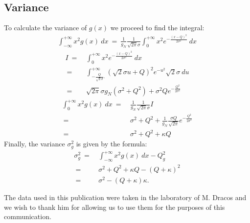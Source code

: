\documentclass[a4paper,11pt]{article}
\begin{document}
\subsection*{Variance}
%

To calculate the variance of $g(x)$ we proceed to find the integral:
\begin{align}
 \int_{-\infty}^{+\infty} x^2 g(x) \ dx \ = \ \frac{1}{g_N} \frac{1}{\sqrt{2\pi}\sigma} \int_{0}^{+\infty} x^2 e^{-\frac{(x-Q)^2}{2\sigma^2}} \ dx
\end{align}
\begin{align}
 I \ =  \ &\int_{0}^{+\infty} x^2 e^{-\frac{(x-Q)^2}{2\sigma^2}} \ dx  \nonumber \\
 \  = \ & \int_{  -\frac{Q}{\sqrt{2}\sigma}.  }^{+\infty}  ( \sqrt{2}\sigma u + Q )^2 e^{-u^2} \sqrt{2}\sigma \ du \nonumber \\
 \  = \ & \sqrt{2\pi}\sigma g_N ( \sigma^2 + Q^2 ) + \sigma^2 Q e^{-  \frac{Q^2}{2\sigma^2 } }
\end{align}
\begin{align}
 \int_{0}^{+\infty} x^2 g(x) \ dx \ = \ &  \frac{1}{g_N} \frac{1}{\sqrt{2\pi}\sigma} I \ \nonumber \\
 \  = \ & \sigma^2 + Q^2 +  \frac{1}{g_N}\frac{\sigma Q }{\sqrt{2\pi}} e^{-  \frac{Q^2}{2\sigma^2 } }  \nonumber \\
  \  = \ & \sigma^2 + Q^2 + \kappa Q
\end{align}
Finally, the variance $\sigma_g^2$ is given by the formula:
\begin{align}
\sigma_g^2 \ = \ & \int_{-\infty}^{+\infty} x^2 g(x) \ dx - Q_g^2 \nonumber \\
\  = \ & \sigma^2 + Q^2 + \kappa Q - ( Q+\kappa)^2 \nonumber \\
\  = \ & \sigma^2  - ( Q + \kappa )\kappa. 
 \end{align}






\acknowledgments
%

The data used in this publication were taken in the laboratory of M. Dracos and we wish to thank him for allowing us to use them for the purposes of this communication. 

\end{document}
